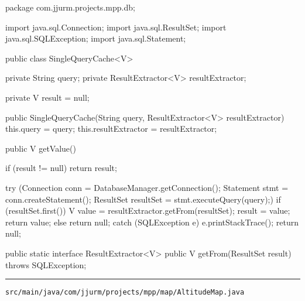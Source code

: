 \begin{javacode}
package com.jjurm.projects.mpp.db;

import java.sql.Connection;
import java.sql.ResultSet;
import java.sql.SQLException;
import java.sql.Statement;

public class SingleQueryCache<V> {

  private String query;
  private ResultExtractor<V> resultExtractor;

  private V result = null;

  public SingleQueryCache(String query, ResultExtractor<V> resultExtractor) {
    this.query = query;
    this.resultExtractor = resultExtractor;
  }

  public V getValue() {

    if (result != null) {
      return result;
    }

    try (Connection conn = DatabaseManager.getConnection();
        Statement stmt = conn.createStatement();
        ResultSet resultSet = stmt.executeQuery(query);) {
      if (resultSet.first()) {
        V value = resultExtractor.getFrom(resultSet);
        result = value;
        return value;
      } else {
        return null;
      }
    } catch (SQLException e) {
      e.printStackTrace();
      return null;
    }
  }

  public static interface ResultExtractor<V> {
    public V getFrom(ResultSet result) throws SQLException;
  }

}
\end{javacode}

\noindent\rule{\textwidth}{0.4pt}

\nointerlineskip
\texttt{src/main/java/com/jjurm/projects/mpp/map/AltitudeMap.java}

